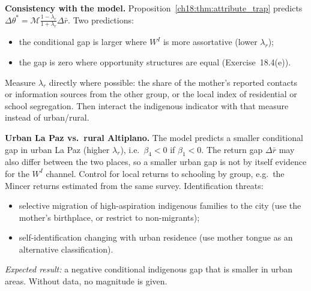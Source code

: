 \documentclass[../solutions_manual.tex]{subfiles}
\begin{document}
 \textbf{Consistency with the model.} Proposition~\ref{ch18:thm:attribute_trap} predicts $\Delta\theta^* = \mathcal{M}\frac{1-\lambda_r}{1+\lambda_r}\Delta\bar r$. Two predictions:
\begin{itemize}
\item the conditional gap is larger where $W^I$ is more assortative (lower $\lambda_r$);
\item the gap is zero where opportunity structures are equal (Exercise~18.4(e)).
\end{itemize}
Measure $\lambda_r$ directly where possible: the share of the mother's reported contacts or information sources from the other group, or the local index of residential or school segregation. Then interact the indigenous indicator with that measure instead of urban/rural.

 \textbf{Urban La Paz vs.\ rural Altiplano.} The model predicts a smaller conditional gap in urban La Paz (higher $\lambda_r$), i.e.\ $\beta_4 < 0$ if $\beta_1 < 0$. The return gap $\Delta\bar r$ may also differ between the two places, so a smaller urban gap is not by itself evidence for the $W^I$ channel. Control for local returns to schooling by group, e.g.\ the Mincer returns estimated from the same survey. Identification threats:
\begin{itemize}
\item selective migration of high-aspiration indigenous families to the city (use the mother's birthplace, or restrict to non-migrants);
\item self-identification changing with urban residence (use mother tongue as an alternative classification).
\end{itemize}
\emph{Expected result:} a negative conditional indigenous gap that is smaller in urban areas. Without data, no magnitude is given.

\endgroup
\end{document}
